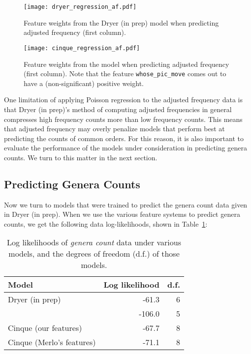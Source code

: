 \documentclass[11pt]{article}
\begin{document}
\begin{figure}[ht!]
  \centering
  \texttt{[image: dryer\_regression\_af.pdf]}
  \caption{Feature weights from the Dryer (in prep) model when predicting adjusted frequency (first column).}
  \label{fig:dryer-model}
\end{figure}

\begin{figure}[ht!]
  \centering
  \texttt{[image: cinque\_regression\_af.pdf]}
  \cprotect\caption{Feature weights from the \citet{cinque2005deriving} model when predicting adjusted frequency (first column). Note that the feature \verb+whose_pic_move+ comes out to have a (non-significant) positive weight.}
  \label{fig:cinque-model}
\end{figure}

One limitation of applying Poisson regression to the adjusted
frequency data is that Dryer (in prep)'s method of computing adjusted
frequencies in general compresses high frequency counts more than low
frequency counts.  This means that adjusted frequency may overly penalize
models that perform best at predicting the counts of common orders.
For this reason, it is also important to evaluate the performance of the models under
consideration in predicting genera counts.  We turn to this matter in
the next section.

\subsection{Predicting Genera Counts}

Now we turn to models that were trained to predict the genera count data given in Dryer (in prep).
When we use the various feature systems to predict genera counts, we get the following data log-likelihoods, shown in Table~\ref{tab:genera-likelihoods}:

\begin{table}
  \centering
  \begin{tabular}{|l|r|r|}
    \hline
    Model & Log likelihood & d.f. \\
    \hline
    Dryer (in prep) & -61.3 & 6 \\
    \citet{cysouw2010dealing} & -106.0 & 5 \\
    Cinque (our features) & -67.7 & 8 \\
    Cinque (Merlo's features) & -71.1 & 8 \\
    \hline 
  \end{tabular}
  \caption{Log likelihoods of \emph{genera count} data under various models, and the degrees of freedom (d.f.) of those models.}  
  \label{tab:genera-likelihoods}
\end{table}
\end{document}
